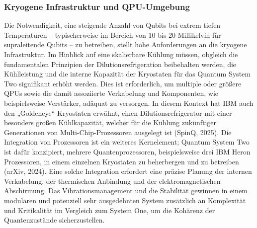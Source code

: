 \subsubsection{Kryogene Infrastruktur und QPU-Umgebung}
Die Notwendigkeit, eine steigende Anzahl von Qubits bei extrem tiefen Temperaturen – typischerweise im Bereich von 10 bis 20 Millikelvin für supraleitende Qubits – zu betreiben, stellt hohe Anforderungen an die kryogene Infrastruktur. Im Hinblick auf eine skalierbare Kühlung müssen, obgleich die fundamentalen Prinzipien der Dilutionsrefrigeration beibehalten werden, die Kühlleistung und die interne Kapazität der Kryostaten für das Quantum System Two signifikant erhöht werden. Dies ist erforderlich, um multiple oder größere QPUs sowie die damit assoziierte Verkabelung und Komponenten, wie beispielsweise Verstärker, adäquat zu versorgen. In diesem Kontext hat IBM auch den „Goldeneye“-Kryostaten erwähnt, einen Dilutionsrefrigerator mit einer besonders großen Kühlkapazität, welcher für die Kühlung zukünftiger Generationen von Multi-Chip-Prozessoren ausgelegt ist (SpinQ, 2025). Die Integration von Prozessoren ist ein weiteres Kernelement; Quantum System Two ist dafür konzipiert, mehrere Quantenprozessoren, beispielsweise drei IBM Heron Prozessoren, in einem einzelnen Kryostaten zu beherbergen und zu betreiben (arXiv, 2024). Eine solche Integration erfordert eine präzise Planung der internen Verkabelung, der thermischen Anbindung und der elektromagnetischen Abschirmung. Das Vibrationsmanagement und die Stabilität gewinnen in einem modularen und potenziell sehr ausgedehnten System zusätzlich an Komplexität und Kritikalität im Vergleich zum System One, um die Kohärenz der Quantenzustände sicherzustellen.

